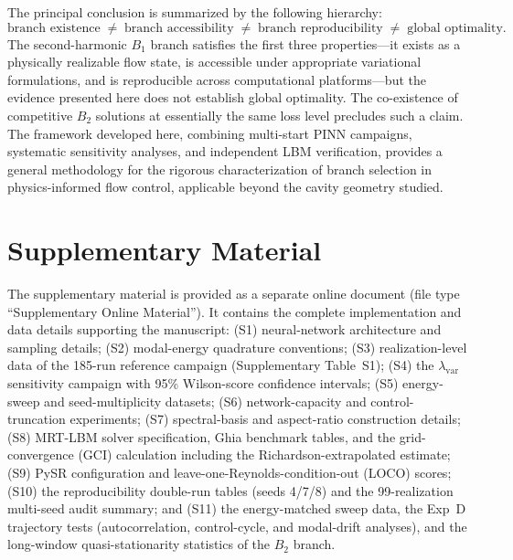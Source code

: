 \documentclass[a4paper,11pt]{article}
\begin{document}
The principal conclusion is summarized by the following hierarchy:
\begin{equation}
\boxed{\text{branch existence}\;\neq\;\text{branch accessibility}
\;\neq\;\text{branch reproducibility}\;\neq\;\text{global optimality}.}
\label{eq:hierarchy}
\end{equation}
The second-harmonic \(B_1\) branch satisfies the first three properties---it exists
as a physically realizable flow state, is accessible under appropriate variational
formulations, and is reproducible across computational platforms---but the evidence
presented here does not establish global optimality. The co-existence of competitive
\(B_2\) solutions at essentially the same loss level precludes such a claim.
The framework developed here, combining multi-start PINN campaigns, systematic
sensitivity analyses, and independent LBM verification, provides a general methodology
for the rigorous characterization of branch selection in physics-informed flow
control, applicable beyond the cavity geometry studied.

\section*{Supplementary Material}
The supplementary material is provided as a separate online document (file type
``Supplementary Online Material''). It contains the complete implementation and
data details supporting the manuscript: (S1) neural-network architecture and
sampling details; (S2) modal-energy quadrature conventions; (S3) realization-level
data of the 185-run reference campaign (Supplementary Table~S1); (S4) the
\(\lambda_{\mathrm{var}}\) sensitivity campaign with 95\% Wilson-score confidence
intervals; (S5) energy-sweep and seed-multiplicity datasets; (S6) network-capacity
and control-truncation experiments; (S7) spectral-basis and aspect-ratio
construction details; (S8) MRT-LBM solver specification, Ghia benchmark tables,
and the grid-convergence (GCI) calculation including the Richardson-extrapolated
estimate; (S9) PySR configuration and leave-one-Reynolds-condition-out (LOCO)
scores; (S10) the reproducibility double-run tables (seeds 4/7/8) and the
99-realization multi-seed audit summary; and (S11) the energy-matched sweep data,
the Exp~D trajectory tests (autocorrelation, control-cycle, and modal-drift
analyses), and the long-window quasi-stationarity statistics of the \(B_2\) branch.
\end{document}
